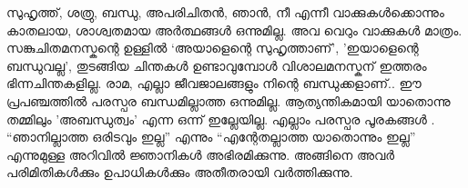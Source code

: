 സുഹൃത്ത്, ശത്രു, ബന്ധു, അപരിചിതൻ, ഞാൻ, നീ എന്നീ വാക്കുകൾക്കൊന്നും കാതലായ, ശാശ്വതമായ അർത്ഥങ്ങൾ ഒന്നുമില്ല. അവ വെറും വാക്കുകൾ മാത്രം. സങ്കുചിതമനസ്കന്റെ ഉള്ളിൽ ‘അയാളെന്റെ സുഹൃത്താണ്‌’, 'ഇയാളെന്റെ ബന്ധുവല്ല', തുടങ്ങിയ ചിന്തകൾ ഉണ്ടാവുമ്പോൾ വിശാലമനസ്കന്‌ ഇത്തരം ഭിന്നചിന്തകളില്ല. രാമ, എല്ലാ ജീവജാലങ്ങളും നിന്റെ ബന്ധുക്കളാണ്‌..  ഈ പ്രപഞ്ചത്തിൽ പരസ്പര ബന്ധമില്ലാത്ത ഒന്നുമില്ല. ആത്യന്തികമായി യാതൊന്നു തമ്മിലും 'അബന്ധുത്വം' എന്ന ഒന്ന് ഇല്ലേയില്ല. എല്ലാം പരസ്പര പൂരകങ്ങള്‍ . “ഞാനില്ലാത്ത ഒരിടവും ഇല്ല” എന്നും “എന്റേതല്ലാത്ത യാതൊന്നും ഇല്ല” എന്നുമുള്ള അറിവിൽ ജ്ഞാനികള്‍ അഭിരമിക്കുന്നു. അങ്ങിനെ അവർ പരിമിതികൾക്കും ഉപാധികൾക്കും അതീതരായി വർത്തിക്കുന്നു. 
